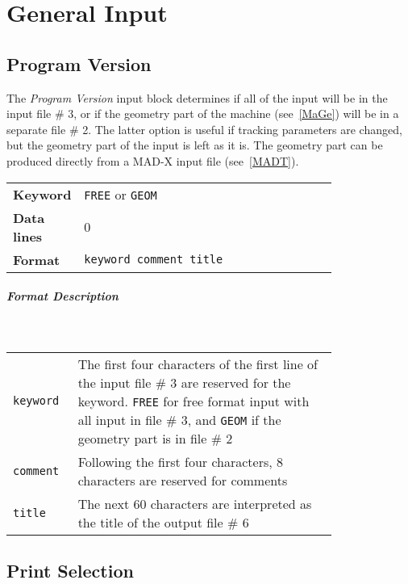 
\chapter{General Input} \label{GenInp}

\section{Program Version} \label{ProVer}

The \textit{Program Version} input block determines if all of the input will be in the input file \# 3, or if the geometry part of the machine (see~\ref{MaGe}) will be in a separate file \# 2.
The latter option is useful if tracking parameters are changed, but the geometry part of the input is left as it is.
The geometry part can be produced directly from a MAD-X input file (see~\ref{MADT}).

\bigskip
\begin{tabular}{@{}lp{0.8\linewidth}}
    \textbf{Keyword}    & \texttt{FREE} or \texttt{GEOM} \\
    \textbf{Data lines} & 0 \\
    \textbf{Format}     & \texttt{keyword comment title} \\
\end{tabular}

\paragraph{Format Description}~

\bigskip
\begin{tabular}{@{}lp{0.8\linewidth}}
    \texttt{keyword} & The first four characters of the first line of the input file \# 3 are reserved for the keyword. \texttt{FREE} for free format input with all input in file \# 3, and \texttt{GEOM} if the geometry part is in file \# 2 \\
    \texttt{comment} & Following the first four characters, 8 characters are reserved for comments \\
    \texttt{title}   & The next 60 characters are interpreted as the title of the output file \# 6
\end{tabular}

\section{Print Selection} \label{PriSel}

